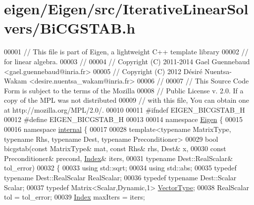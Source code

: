 \hypertarget{eigen_2_eigen_2src_2_iterative_linear_solvers_2_bi_c_g_s_t_a_b_8h_source}{}\section{eigen/\+Eigen/src/\+Iterative\+Linear\+Solvers/\+Bi\+C\+G\+S\+T\+AB.h}
\label{eigen_2_eigen_2src_2_iterative_linear_solvers_2_bi_c_g_s_t_a_b_8h_source}

\begin{DoxyCode}
00001 \textcolor{comment}{// This file is part of Eigen, a lightweight C++ template library}
00002 \textcolor{comment}{// for linear algebra.}
00003 \textcolor{comment}{//}
00004 \textcolor{comment}{// Copyright (C) 2011-2014 Gael Guennebaud <gael.guennebaud@inria.fr>}
00005 \textcolor{comment}{// Copyright (C) 2012 Désiré Nuentsa-Wakam <desire.nuentsa\_wakam@inria.fr>}
00006 \textcolor{comment}{//}
00007 \textcolor{comment}{// This Source Code Form is subject to the terms of the Mozilla}
00008 \textcolor{comment}{// Public License v. 2.0. If a copy of the MPL was not distributed}
00009 \textcolor{comment}{// with this file, You can obtain one at http://mozilla.org/MPL/2.0/.}
00010 
00011 \textcolor{preprocessor}{#ifndef EIGEN\_BICGSTAB\_H}
00012 \textcolor{preprocessor}{#define EIGEN\_BICGSTAB\_H}
00013 
00014 \textcolor{keyword}{namespace }\hyperlink{namespace_eigen}{Eigen} \{ 
00015 
00016 \textcolor{keyword}{namespace }\hyperlink{namespaceinternal}{internal} \{
00017 
00028 \textcolor{keyword}{template}<\textcolor{keyword}{typename} MatrixType, \textcolor{keyword}{typename} Rhs, \textcolor{keyword}{typename} Dest, \textcolor{keyword}{typename} Preconditioner>
00029 \textcolor{keywordtype}{bool} bicgstab(\textcolor{keyword}{const} MatrixType& mat, \textcolor{keyword}{const} Rhs& rhs, Dest& x,
00030               \textcolor{keyword}{const} Preconditioner& precond, \hyperlink{namespace_eigen_a62e77e0933482dafde8fe197d9a2cfde}{Index}& iters,
00031               \textcolor{keyword}{typename} Dest::RealScalar& tol\_error)
00032 \{
00033   \textcolor{keyword}{using} std::sqrt;
00034   \textcolor{keyword}{using} std::abs;
00035   \textcolor{keyword}{typedef} \textcolor{keyword}{typename} Dest::RealScalar RealScalar;
00036   \textcolor{keyword}{typedef} \textcolor{keyword}{typename} Dest::Scalar Scalar;
00037   \textcolor{keyword}{typedef} Matrix<Scalar,Dynamic,1> \hyperlink{struct_vector_type}{VectorType};
00038   RealScalar tol = tol\_error;
00039   \hyperlink{namespace_eigen_a62e77e0933482dafde8fe197d9a2cfde}{Index} maxIters = iters;

\end{DoxyCode}
